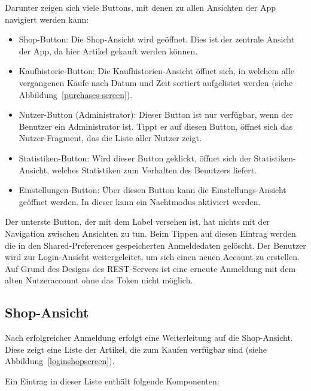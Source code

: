 Darunter zeigen sich viele Buttons, mit denen zu allen Ansichten der App navigiert werden kann:

\begin{itemize}
	\item Shop-Button: Die Shop-Ansicht wird geöffnet.
	Dies ist der zentrale Ansicht der App, da hier Artikel gekauft werden können.

	\item Kaufhistorie-Button: Die Kaufhistorien-Ansicht öffnet sich, in welchem alle vergangenen Käufe nach Datum und Zeit sortiert aufgelistet werden (siehe Abbildung~\ref{purchases-screen}).

	\item Nutzer-Button (Administrator): Dieser Button ist nur verfügbar, wenn der Benutzer ein Administrator ist.
	Tippt er auf diesen Button, öffnet sich das Nutzer-Fragment, das die Liste aller Nutzer zeigt.

	\item Statistiken-Button: Wird dieser Button geklickt, öffnet sich der Statistiken-Ansicht, welches Statistiken zum Verhalten des Benutzers liefert.

	\item Einstellungen-Button: Über diesen Button kann die Einstellungs-Ansicht geöffnet werden.
	In dieser kann ein Nachtmodus aktiviert werden.

\end{itemize}

Der unterste Button, der mit dem Label  versehen ist, hat nichts mit der Navigation zwischen Ansichten zu tun.
Beim Tippen auf diesen Eintrag werden die in den Shared-Preferences gespeicherten Anmeldedaten gelöscht.
Der Benutzer wird zur Login-Ansicht weitergeleitet, um sich einen neuen Account zu erstellen.
Auf Grund des Designs des REST-Servers ist eine erneute Anmeldung mit dem alten Nutzeraccount ohne das Token nicht möglich.

\subsection{Shop-Ansicht}\label{subsec:shop-screen}

Nach erfolgreicher Anmeldung erfolgt eine Weiterleitung auf die Shop-Ansicht.
Diese zeigt eine Liste der Artikel, die zum Kaufen verfügbar sind (siehe Abbildung~\ref{loginshopscreen}).

Ein Eintrag in dieser Liste enthält folgende Komponenten:

